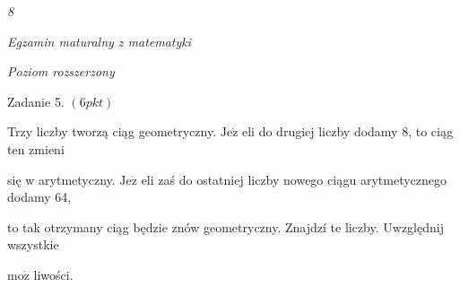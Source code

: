 \documentclass[a4paper,12pt]{article}
\begin{document}
{\it 8}

{\it Egzamin maturalny z matematyki}

{\it Poziom rozszerzony}

Zadanie 5. $(6pkt)$

Trzy liczby tworzą ciąg geometryczny. $\mathrm{J}\mathrm{e}\dot{\mathrm{z}}$ eli do drugiej liczby dodamy 8, to ciąg ten zmieni

się w arytmetyczny. $\mathrm{J}\mathrm{e}\dot{\mathrm{z}}$ eli zaś do ostatniej liczby nowego ciągu arytmetycznego dodamy 64,

to tak otrzymany ciąg będzie znów geometryczny. Znajdzí te liczby. Uwzględnij wszystkie

$\mathrm{m}\mathrm{o}\dot{\mathrm{z}}$ liwości.
\end{document}
